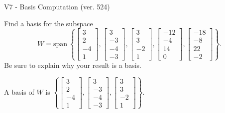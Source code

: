 \begin{exercise}
  \begin{exerciseTitle}V7 - Basis Computation (ver. 524)\end{exerciseTitle}
  \begin{exerciseStatement}
    Find a basis for the subspace 
\[W=\mathrm{span}\ \left\{\left[\begin{array}{r}
3 \\
2 \\
-4 \\
1
\end{array}\right] , \left[\begin{array}{r}
3 \\
-3 \\
-4 \\
-3
\end{array}\right] , \left[\begin{array}{r}
3 \\
3 \\
-2 \\
1
\end{array}\right] , \left[\begin{array}{r}
-12 \\
-4 \\
14 \\
0
\end{array}\right] , \left[\begin{array}{r}
-18 \\
-8 \\
22 \\
-2
\end{array}\right]\right\}.\]
 Be sure to explain why your result is a basis.


  \end{exerciseStatement}
  \begin{exerciseAnswer}
   A basis of \(W\) is  \(\left\{\left[\begin{array}{r}
3 \\
2 \\
-4 \\
1
\end{array}\right] , \left[\begin{array}{r}
3 \\
-3 \\
-4 \\
-3
\end{array}\right] , \left[\begin{array}{r}
3 \\
3 \\
-2 \\
1
\end{array}\right]\right\}\).
  


  \end{exerciseAnswer}
\end{exercise}
